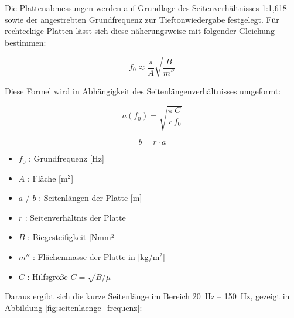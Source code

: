 Die Plattenabmessungen werden auf Grundlage des Seitenverhältnisses 1:1,618 sowie der angestrebten Grundfrequenz zur Tieftonwiedergabe festgelegt. Für rechteckige Platten lässt sich diese näherungsweise mit folgender Gleichung bestimmen:

\begin{equation}
f_0 \approx \frac{\pi}{A}\sqrt{\frac{B}{m''}}
\end{equation}

Diese Formel wird in Abhängigkeit des Seitenlängenverhältnisses umgeformt:

\begin{equation}
a(f_0) = \sqrt{\frac{\pi}{r}\frac{C}{f_0}}
\end{equation}

\begin{equation}
b = r \cdot a
\end{equation}

\begin{itemize}
    \item $f_0$ : Grundfrequenz [Hz]
    \item $A$ : Fläche [m$^2$]
    \item $a$ / $b$ : Seitenlängen der Platte [m]
    \item $r$ : Seitenverhältnis der Platte
    \item $B$ : Biegesteifigkeit [Nmm²]
    \item $m''$ : Flächenmasse der Platte in [kg/m$^2$]
    \item $C$ : Hilfsgröße $C = \sqrt{B/\mu}$
\end{itemize}

Daraus ergibt sich die kurze Seitenlänge im Bereich \SI{20}{\hertz} -- \SI{150}{\hertz}, gezeigt in Abbildung \ref{fig:seitenlaenge_frequenz}:

